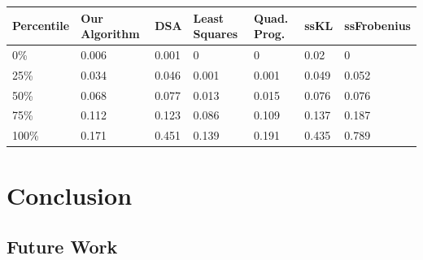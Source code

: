 \documentclass[reqno,12pt,oneside]{report}\usepackage[]{graphicx}\usepackage[]{color}
\theoremstyle{plain}
\theoremstyle{definition}
\theoremstyle{remark}
\numberwithin{theorem}{chapter}     %
\begin{document}
\begin{table}[ht]
\centering
\begin{tabular}{lllllll}
  \hline
Percentile & Our Algorithm & DSA & Least Squares & Quad. Prog. & ssKL & ssFrobenius \\ 
  \hline
0\% & 0.006 & 0.001 & 0 & 0 & 0.02 & 0 \\ 
  25\% & 0.034 & 0.046 & 0.001 & 0.001 & 0.049 & 0.052 \\ 
  50\% & 0.068 & 0.077 & 0.013 & 0.015 & 0.076 & 0.076 \\ 
  75\% & 0.112 & 0.123 & 0.086 & 0.109 & 0.137 & 0.187 \\ 
  100\% & 0.171 & 0.451 & 0.139 & 0.191 & 0.435 & 0.789 \\ 
   \hline
\end{tabular}
\end{table}




 
 \chapter{Conclusion}
 \label{chap:Conclusion}


\lipsum[2]

\section{Future Work}

\lipsum[3]
 

\renewcommand{\bibsection}{}
\startbibliography
 \begin{singlespace} %
  
 \end{singlespace}
 
\startappendices
{}
\end{document}
